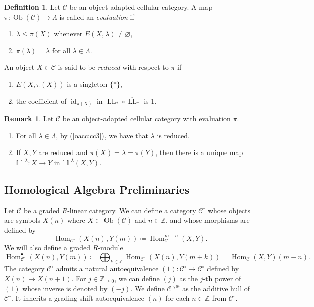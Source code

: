 \documentclass{amsart}
\newcommand{\Z}{\mathbb{Z}}
\newcommand{\scrC}{\mathcal{C}}
\DeclareMathOperator{\Hom}{Hom}
\DeclareMathOperator{\Ob}{Ob}
\DeclareMathOperator{\id}{id}
\DeclareMathOperator{\LL}{LL}
\newcommand{\dLL}{\mathbb{L}\mathbb{L}}
\renewcommand{\emptyset}{\varnothing}
\theoremstyle{definition}
\newtheorem{definition}[subsubsection]{Definition}
\newtheorem{remark}[subsubsection]{Remark}
\numberwithin{equation}{subsection}
\begin{document}
\begin{definition}
    Let $\scrC$ be an object-adapted cellular category. A map $\pi : \Ob (\scrC) \to \Lambda$ is called an \emph{evaluation} if
    \begin{enumerate}
        \item $\lambda \leq \pi (X)$ whenever $E(X, \lambda) \neq \emptyset$,
        \item  $\pi (\lambda) = \lambda$ for all $\lambda \in \Lambda$.
    \end{enumerate}

    An object $X \in \scrC$ is said to be \emph{reduced} with respect to $\pi$ if 
    \begin{enumerate}
        \item $E(X, \pi (X))$ is a singleton $\{*\}$,
        \item the coefficient of $\id_{\pi (X)}$ in $\LL_* \circ \overline{\LL}_{*}$ is 1.
    \end{enumerate}
\end{definition}

\begin{remark}\label{rem:OACC_with_evals}
    Let $\scrC$ be an object-adapted cellular category with evaluation $\pi$.
    \begin{enumerate}
        \item For all $\lambda \in \Lambda$, by (\ref{oacc:cc3}), we have that $\lambda$ is reduced.
        \item If $X, Y$ are reduced and $\pi (X) = \lambda = \pi (Y)$, then there is a unique map $\dLL^{\lambda} : X \to Y$ in $\dLL^{\lambda} (X,Y)$.
    \end{enumerate}
\end{remark}

\subsection{Homological Algebra Preliminaries}

Let $\scrC$ be a graded $R$-linear category. 
We can define a category $\scrC^{\circ}$ whose objects are symbols $X(n)$ where $X \in \Ob (\scrC)$ and $n \in \Z$, and whose morphisms are defined by
\[\Hom_{\scrC^{\circ}} (X (n), Y(m)) \coloneq \Hom_{\scrC}^{m-n} (X,Y).\]
We will also define a graded $R$-module
\[\Hom_{\scrC^{\circ}}^{\bullet} (X (n), Y(m)) \coloneq \bigoplus_{k \in \Z} \Hom_{\scrC^{\circ}} (X (n), Y(m + k)) = \Hom_{\scrC} (X, Y) (m-n).\]
The category $\scrC^{\circ}$ admits a natural autoequivalence $(1) : \scrC^{\circ} \to \scrC^{\circ}$ defined by $X(n) \mapsto X(n+1)$.
For $j \in \Z_{\geq 0}$, we can define $(j)$ as the $j$-th power of $(1)$ whose inverse is denoted by $(-j)$. 
We define $\scrC^{\circ, \oplus}$ as the additive hull of $\scrC^{\circ}$. It inherits a grading shift autoequivalence $(n)$ for each $n \in \Z$ from $\scrC^{\circ}$.
\end{document}
